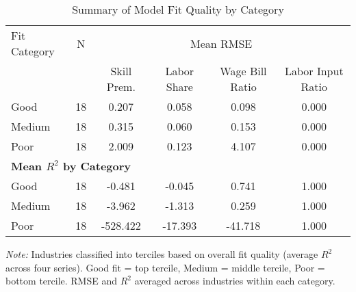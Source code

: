 \begin{table}[H]
\caption{Summary of Model Fit Quality by Category}
\label{tab:fit_quality_summary}
\begin{center}
\begin{tabular}{lccccc}
\toprule
Fit Category & N & \multicolumn{4}{c}{Mean RMSE} \\
\cmidrule(lr){3-6}
& & Skill Prem. & Labor Share & Wage Bill Ratio & Labor Input Ratio \\
\midrule
Good & 18 & 0.207 & 0.058 & 0.098 & 0.000 \\
Medium & 18 & 0.315 & 0.060 & 0.153 & 0.000 \\
Poor & 18 & 2.009 & 0.123 & 4.107 & 0.000 \\
\midrule
\multicolumn{6}{l}{\textbf{Mean $R^2$ by Category}} \\
\midrule
Good & 18 & -0.481 & -0.045 & 0.741 & 1.000 \\
Medium & 18 & -3.962 & -1.313 & 0.259 & 1.000 \\
Poor & 18 & -528.422 & -17.393 & -41.718 & 1.000 \\
\bottomrule
\end{tabular}
\end{center}
\begin{minipage}{\textwidth}
\small
\textit{Note:} Industries classified into terciles based on overall fit quality (average $R^2$ across four series). 
Good fit = top tercile, Medium = middle tercile, Poor = bottom tercile. RMSE and $R^2$ averaged across industries within each category.
\end{minipage}
\end{table}

